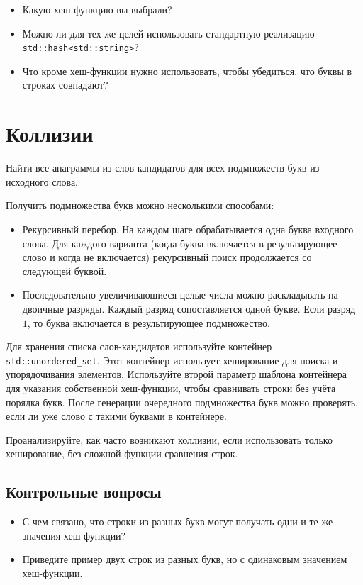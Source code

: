 \documentclass[10pt,twoside,openany]{book}
\begin{document}
\begin{itemize}
    \item Какую хеш-функцию вы выбрали?
    \item Можно ли для тех же целей использовать стандартную
          реализацию {\tt std::hash<std::string>}?
    \item Что кроме хеш-функции нужно использовать, чтобы убедиться, что буквы в строках совпадают?
\end{itemize}

\section{Коллизии}

Найти все анаграммы из слов-кандидатов для всех подмножеств букв из исходного слова.

Получить подмножества букв можно несколькими способами:
\begin{itemize}
    \item Рекурсивный перебор. На каждом шаге обрабатывается одна буква входного слова.
          Для каждого варианта (когда буква включается в результирующее слово и когда не включается)
          рекурсивный поиск продолжается со следующей буквой.
    \item Последовательно увеличивающиеся целые числа можно раскладывать на двоичные разряды.
          Каждый разряд сопоставляется одной букве. Если разряд $1$, то буква включается
          в результирующее подмножество.
\end{itemize}

Для хранения списка слов-кандидатов используйте контейнер {\tt std::unordered\_set}.
Этот контейнер использует хеширование для поиска и упорядочивания элементов.
Используйте второй параметр шаблона контейнера для указания собственной хеш-функции,
чтобы сравнивать строки без учёта порядка букв.
После генерации очередного подмножества букв можно проверять, если ли уже слово с такими
буквами в контейнере.

Проанализируйте, как часто возникают коллизии, если использовать только хеширование,
без сложной функции сравнения строк.

\subsection*{Контрольные вопросы}

\begin{itemize}
    \item С чем связано, что строки из разных букв могут получать одни и те же значения
          хеш-функции?
    \item Приведите пример двух строк из разных букв, но с одинаковым значением хеш-функции.
\end{itemize}
\end{document}
